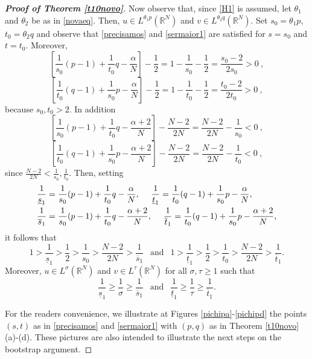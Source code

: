 \documentclass[12pt,a4paper]{article}
\numberwithin{equation}{section}
\begin{document}
\begin{proof}[\bf{Proof of Theorem \ref{t10novo}}]
Now observe that, since \eqref{H1} is assumed, let $\theta_1$ and $\theta_2$ be as in \eqref{novaeq}.  Then, $u\in L^{\theta_1 p}(\mathbb{R}^N)$ and $v\in L^{\theta_2 q}(\mathbb{R}^N)$. Set $s_0 =\theta_1 p $, $t_0 =\theta_2 q $ and observe that \eqref{precisamos} and \eqref{sermaior1} are satisfied for $s=s_0$ and $t=t_0$. Moreover, 
\[
\left[\dfrac{1}{s_0}(p-1)+\dfrac{1}{t_0}q-\dfrac{\alpha}{N}\right]  - \dfrac{1}{2} =  1 - \dfrac{1}{s_0} -\dfrac{1}{2} = \dfrac{s_0-2}{2s_0}>0 \ ,\]
\[
\left[\dfrac{1}{t_0}(q-1)+\dfrac{1}{s_0}p-\dfrac{\alpha}{N}\right]-\dfrac{1}{2}= 1 - \dfrac{1}{t_0} - \dfrac{1}{2} = \dfrac{t_0-2}{2t_0}>0 \ ,
\]
because $s_0,t_0>2$. In addition
$$
\left[ \dfrac{1}{s_0}(p-1)+\dfrac{1}{t_0}q-\dfrac{\alpha+2}{N} \right] - \frac{N-2}{2N}=  \dfrac{N-2}{2N} - \frac{1}{s_0} <0\ ,
$$
$$
\left[ \dfrac{1}{t_0}(q-1)+\dfrac{1}{s_0}p-\dfrac{\alpha+2}{N}\right] - \frac{N-2}{2N}=\dfrac{N-2}{2N} - \frac{1}{t_0} <0 \ ,
$$
since $\frac{N-2}{2N} < \frac{1}{s_0}, \frac{1}{t_0}$. Then, setting
\begin{align}
&\dfrac{1}{\underline{s}_1} = \dfrac{1}{s_0}(p-1)+\dfrac{1}{t_0}q-\dfrac{\alpha}{N}, \ \ \ \ \dfrac{1}{\underline{t}_1} = \dfrac{1}{t_0}(q-1)+\dfrac{1}{s_0}p-\dfrac{\alpha}{N}, \vspace{10pt}\label{underline}\\
& \dfrac{1}{\overline{s}_1} = \dfrac{1}{s_0}(p-1)+\dfrac{1}{t_0}q-\dfrac{\alpha+2}{N},  \ \ \ \ \dfrac{1}{\overline{t}_1} =  \dfrac{1}{t_0}(q-1)+\dfrac{1}{s_0}p-\dfrac{\alpha+2}{N} \label{overline},
\end{align}
it follows that 
\begin{equation}\label{underover}
1 > \dfrac{1}{\underline{s}_1} > \dfrac{1}{2} > \dfrac{1}{s_0}> \dfrac{N-2}{2N} > \dfrac{1}{\overline{s}_1} \ \ \text{ and } \ \ 1 > \dfrac{1}{\underline{t}_1} > \dfrac{1}{2} > \dfrac{1}{t_0}> \dfrac{N-2}{2N} > \dfrac{1}{\overline{t}_1}.
\end{equation}
Moreover, $u\in L^\sigma(\mathbb{R}^N)$ and $v \in L^\tau(\mathbb{R}^N)$ for all $\sigma, \tau\geq 1$ such that
\begin{equation}\label{firstrange}
\dfrac{1}{\underline{s}_1} \geq \dfrac{1}{\sigma} \geq \dfrac{1}{\overline{s}_1} \ \ \text{ and } \ \ \dfrac{1}{\underline{t}_1} \geq \dfrac{1}{\tau} \geq \dfrac{1}{\overline{t}_1}.
\end{equation}






\medbreak

For the readers convenience, we illustrate at Figures \ref{pichipa}-\ref{pichipd} the points $(s,t)$ as in \eqref{precisamos} and \eqref{sermaior1} with $(p,q)$ as in Theorem \ref{t10novo} (a)-(d). These pictures are also intended to illustrate the next steps on the bootstrap argument.




\end{proof}
\end{document}
